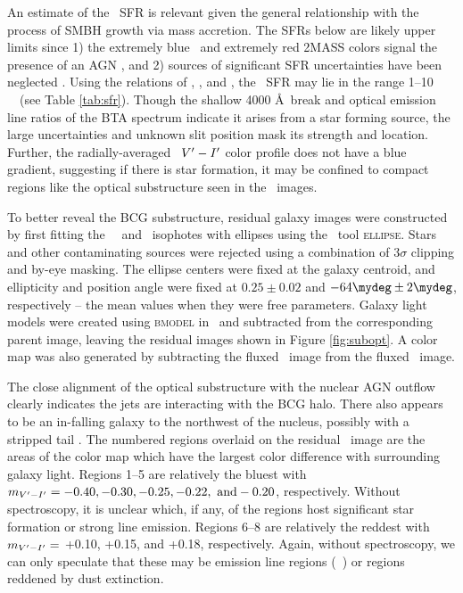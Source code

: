 \documentclass[iop]{emulateapj}
\begin{document}
An estimate of the \rbs\ SFR is relevant given the general
relationship with the process of SMBH growth via mass accretion. The
SFRs below are likely upper limits since 1) the extremely blue
\galex\ and extremely red 2MASS colors signal the presence of an AGN
\citep[\eg][]{2005AJ....130.1022A}, and 2) sources of significant SFR
uncertainties have been neglected \citep[\eg][]{1992ApJ...388..310K,
  2004AJ....127.2002K, hicksuv, 2010MNRAS.tmp..626G}. Using the
relations of \citet{kennicutt2}, \citet{2006ApJ...642..775M}, and
\citet{salim2007}, the \rbs\ SFR may lie in the range 1--10
~\msolpy\ (see Table \ref{tab:sfr}). Though the shallow 4000
\AA\ break and optical emission line ratios of the BTA spectrum
indicate it arises from a star forming source, the large uncertainties
and unknown slit position mask its strength and location. Further, the
radially-averaged \hst\ $V^{\prime}-I^{\prime}$ color profile does not have a blue
gradient, suggesting if there is star formation, it may be confined to
compact regions like the optical substructure seen in the
\hst\ images.

To better reveal the BCG substructure, residual galaxy images were
constructed by first fitting the \hst\ \myv\ and \myi\ isophotes with
ellipses using the \iraf\ tool {\textsc{ellipse}}. Stars and other
contaminating sources were rejected using a combination of $3\sigma$
clipping and by-eye masking. The ellipse centers were fixed at the
galaxy centroid, and ellipticity and position angle were fixed at
$0.25 \pm 0.02$ and $-64\mydeg \pm 2\mydeg$, respectively -- the mean
values when they were free parameters. Galaxy light models were
created using {\textsc{bmodel}} in \iraf\ and subtracted from the
corresponding parent image, leaving the residual images shown in
Figure \ref{fig:subopt}. A color map was also generated by subtracting
the fluxed \myi\ image from the fluxed \myv\ image.

The close alignment of the optical substructure with the nuclear AGN
outflow clearly indicates the jets are interacting with the BCG
halo. There also appears to be an in-falling galaxy to the northwest
of the nucleus, possibly with a stripped tail \citep[see][for an
  example]{2007ApJ...671..190S}. The numbered regions overlaid on the
residual \myv\ image are the areas of the color map which have the
largest color difference with surrounding galaxy light. Regions 1--5
are relatively the bluest with $m_{V^{\prime}-I^{\prime}} = -0.40, -0.30, -0.25,
-0.22, ~\rm{and} -0.20$, respectively. Without spectroscopy, it is
unclear which, if any, of the regions host significant star formation
or strong line emission. Regions 6--8 are relatively the reddest with
$m_{V^{\prime}-I^{\prime}} =$ +0.10, +0.15, and +0.18, respectively. Again,
without spectroscopy, we can only speculate that these may be emission
line regions (\eg\ \halpha) or regions reddened by dust extinction.
\end{document}
